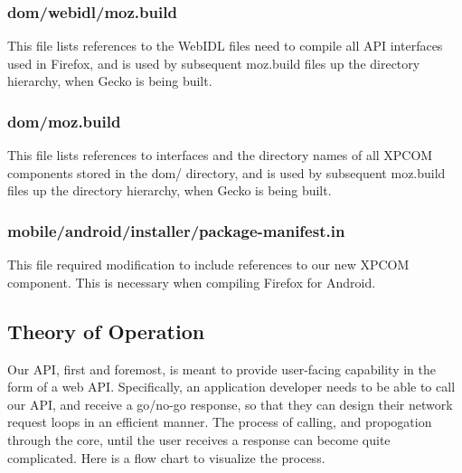 \documentclass[12pt]{article}
\begin{document}
\subsubsection{dom/webidl/moz.build}
This file lists references to the WebIDL files need to compile all API interfaces used in Firefox, and is used by subsequent moz.build files up the directory hierarchy, when Gecko is being built.

\subsubsection{dom/moz.build}
This file lists references to interfaces and the directory names of all XPCOM components stored in the dom/ directory, and is used by subsequent moz.build files up the directory hierarchy, when Gecko is being built.

\subsubsection{mobile/android/installer/package-manifest.in}
This file required modification to include references to our new XPCOM component. This is necessary when compiling Firefox for Android.
\pagebreak

\subsection{Theory of Operation}
Our API, first and foremost, is meant to provide user-facing capability in the form of a web API. Specifically, an application developer needs to be able to call our API, and receive a go/no-go response, so that they can design their network request loops in an efficient manner. The process of calling, and propogation through the core, until the user receives a response can become quite complicated. Here is a flow chart to visualize the process.
\end{document}
